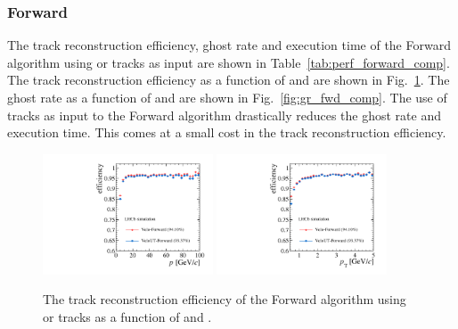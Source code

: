 \subsubsection{Forward}

The track reconstruction efficiency, ghost rate and execution time of the Forward algorithm using \velo or \velout tracks as input are shown in Table~\ref{tab:perf_forward_comp}. The track reconstruction efficiency as a function of \ptot and \pt are shown in Fig.~\ref{fig:eff_fwd_comp}. The ghost rate as a function of \ptot and \pt are shown in Fig.~\ref{fig:gr_fwd_comp}. The use of \velout tracks as input to the Forward algorithm drastically reduces the ghost rate and execution time. This comes at a small cost in the track reconstruction efficiency.

\begin{table}[!tb]
\caption{The performances of the Forward algorithm using \velo or \velout tracks as input in terms of track reconstruction efficiency, ghost rate and execution time.}
 \label{tab:perf_forward_comp}
\end{table}

\begin{figure}[!tb]
\centering
\includegraphics[width=0.45\textwidth]{figs/upstream-tracking-upgrade/fwd_eff_p_comp.pdf}
\includegraphics[width=0.45\textwidth]{figs/upstream-tracking-upgrade/fwd_eff_pt_comp.pdf}
\caption{The track reconstruction efficiency of the Forward algorithm using \velo or \velout tracks as a function of \ptot and \pt.}
\label{fig:eff_fwd_comp}
\end{figure}

